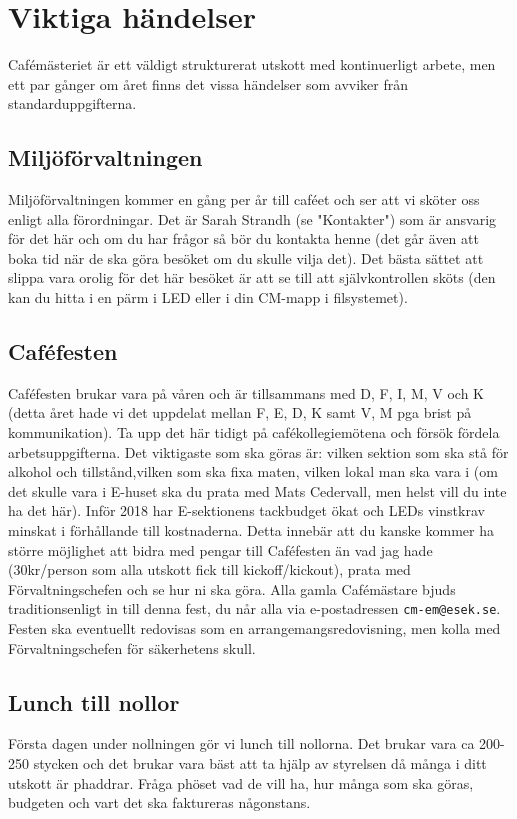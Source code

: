 \documentclass[10pt]{article}
\begin{document}
\section{Viktiga händelser}
Cafémästeriet är ett väldigt strukturerat utskott med kontinuerligt arbete, men ett par gånger om året finns det vissa händelser som avviker från standarduppgifterna.

\subsection{Miljöförvaltningen}
Miljöförvaltningen kommer en gång per år till caféet och ser att vi sköter oss enligt alla förordningar. Det är Sarah Strandh (se "Kontakter") som är ansvarig för det här och om du har frågor så bör du kontakta henne (det går även att boka tid när de ska göra besöket om du skulle vilja det). Det bästa sättet att slippa vara orolig för det här besöket är att se till att självkontrollen sköts (den kan du hitta i en pärm i LED eller i din CM-mapp i filsystemet).

\subsection{Caféfesten}
Caféfesten brukar vara på våren och är tillsammans med D, F, I, M, V och K (detta året hade vi det uppdelat mellan F, E, D, K samt V, M pga brist på kommunikation). Ta upp det här tidigt på cafékollegiemötena och försök fördela arbetsuppgifterna. Det viktigaste som ska göras är: vilken sektion som ska stå för alkohol och tillstånd,vilken som ska fixa maten, vilken lokal man ska vara i (om det skulle vara i E-huset ska du prata med Mats Cedervall, men helst vill du inte ha det här). Inför 2018 har E-sektionens tackbudget ökat och LEDs vinstkrav minskat i förhållande till kostnaderna. Detta innebär att du kanske kommer ha större möjlighet att bidra med pengar till Caféfesten än vad jag hade (30kr/person som alla utskott fick till kickoff/kickout), prata med Förvaltningschefen och se hur ni ska göra. Alla gamla Cafémästare bjuds traditionsenligt in till denna fest, du når alla via e-postadressen \texttt{cm-em@esek.se}. Festen ska eventuellt redovisas som en arrangemangsredovisning, men kolla med Förvaltningschefen för säkerhetens skull.

\subsection{Lunch till nollor}
Första dagen under nollningen gör vi lunch till nollorna. Det brukar vara ca 200-250 stycken och det brukar vara bäst att ta hjälp av styrelsen då många i ditt utskott är phaddrar. Fråga phöset vad de vill ha, hur många som ska göras, budgeten och vart det ska faktureras någonstans.
\end{document}
